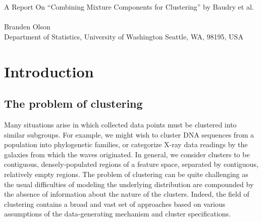 \documentclass{uwstat572}
\renewcommand\;{\,}
\begin{document}

\begin{center}
  {\LARGE A Report On ``Combining Mixture Components for Clustering'' by Baudry et al.}\\\ \\
  {Branden Olson\\ 
    Department of Statistics, University of Washington Seattle, WA, 98195, USA
  }
\end{center}



\begin{abstract}
Model-based clustering typically assumes an underlying Gaussian mixture model, but often the number of mixture components is unknown. 
The familiar Bayesian information criterion, which excels at inferring the number of components, frequently overestimates the number of clusters. 
An extension known as the integrated complete likelihood criterion, which penalizes model entropy, assuages this to yield a more accurate cluster count, although falls flat for non-Gaussian cluster distributions. 
\citet{Baudry10} propose a method with combines the strengths of the two approaches, yielding a sequence of clusterings starting from the BIC solution, and iteratively merging clusters to minimize the resultant entropy.
This method is applied to simulated and real data, demonstrating superior performance in each case.
\end{abstract}

\section{Introduction}

\subsection{The problem of clustering}
Many situations arise in which collected data points must be clustered into similar subgroups. 
For example, we might wish to cluster DNA sequences from a population into phylogenetic families, or categorize X-ray data readings by the galaxies from which the waves originated.
In general, we consider clusters to be contiguous, densely-populated regions of a feature space, separated by contiguous, relatively empty regions.
The problem of clustering can be quite challenging as the usual difficulties of modeling the underlying distribution are compounded by the absence of information about the nature of the clusters.
Indeed, the field of clustering contains a broad and vast set of approaches based on various assumptions of the data-generating mechanism and cluster specifications.
\end{document}
